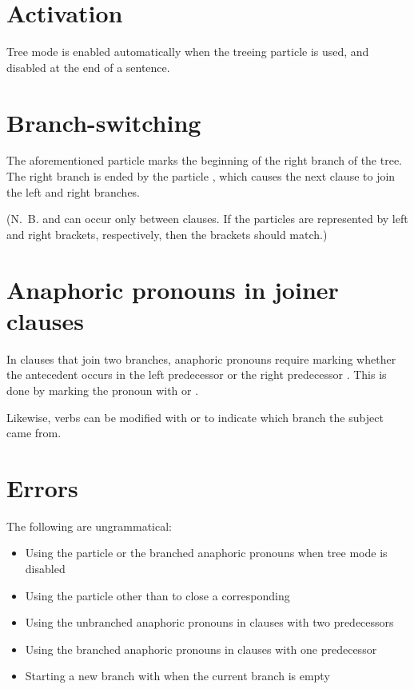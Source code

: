 \documentclass{book}
\begin{document}
\section{Activation}

Tree mode is enabled automatically when the treeing particle  is used, and disabled at the end of a sentence.

\section{Branch-switching}

The aforementioned particle  marks the beginning of the right branch of the tree. The right branch is ended by the particle , which causes the next clause to join the left and right branches.

(N.~B.  and  can occur only between clauses. If the particles are represented by left and right brackets, respectively, then the brackets should match.)

\section{Anaphoric pronouns in joiner clauses}

In clauses that join two branches, anaphoric pronouns require marking whether the antecedent occurs in the left predecessor  or the right predecessor . This is done by marking the pronoun with  or .

Likewise, verbs can be modified with  or  to indicate which branch the subject came from.

\section{Errors}

The following are ungrammatical:

\begin{itemize}
    \item Using the particle  or the branched anaphoric pronouns when tree mode is disabled
    \item Using the particle  other than to close a corresponding 
    \item Using the unbranched anaphoric pronouns in clauses with two predecessors
    \item Using the branched anaphoric pronouns in clauses with one predecessor
    \item Starting a new branch with  when the current branch is empty
\end{itemize}
\end{document}
